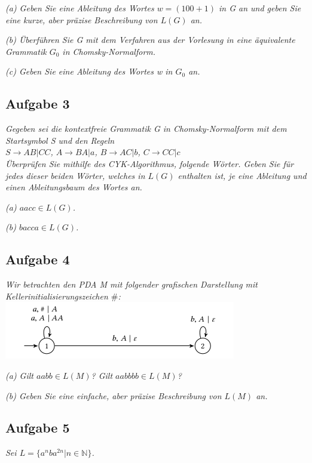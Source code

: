 \documentclass[a4paper]{article}
\begin{document}
\textit{(a) Geben Sie eine Ableitung des Wortes $w = (100 + 1)$ in G an und geben Sie eine kurze, aber präzise Beschreibung von $L(G)$ an.}

\textit{(b) Überführen Sie G mit dem Verfahren aus der Vorlesung in eine äquivalente Grammatik $G_0$ in Chomsky-Normalform.}

\textit{(c) Geben Sie eine Ableitung des Wortes w in $G_0$ an.}


\subsection{Aufgabe 3}
\textit{Gegeben sei die kontextfreie Grammatik G in Chomsky-Normalform mit dem Startsymbol S und den Regeln\\
$S \rightarrow AB | CC$, $A \rightarrow BA | a$, $B \rightarrow AC | b$, $C \rightarrow CC | c$\\
Überprüfen Sie mithilfe des CYK-Algorithmus, folgende Wörter. Geben Sie für jedes dieser beiden Wörter, welches in $L(G)$ enthalten ist, je eine Ableitung und einen Ableitungsbaum des Wortes an.}

\textit{(a) $aacc \in L(G)$.}

\textit{(b) $bacca \in L(G)$. }



\subsection{Aufgabe 4}
\textit{Wir betrachten den PDA M mit folgender grafischen Darstellung mit Kellerinitialisierungszeichen $\#$:}
\includegraphics{Assets/ASK_uebung/u06_02.png}

\textit{(a) Gilt $aabb \in L(M)$? Gilt $aabbbb \in L(M)$?}

\textit{(b) Geben Sie eine einfache, aber präzise Beschreibung von $L(M)$ an.}

\subsection{Aufgabe 5}
\textit{Sei $L = \{a^n ba^{2n} | n\in\mathbb{N}\}$.}
\end{document}
